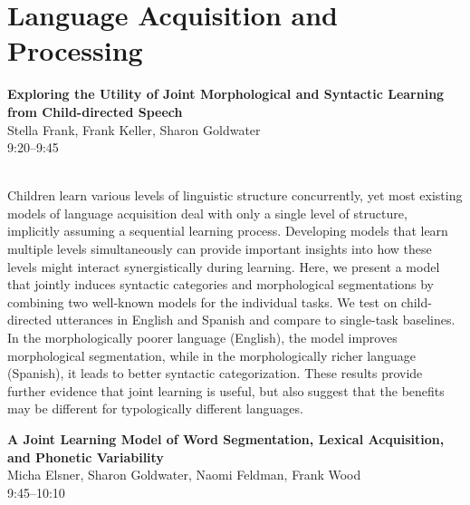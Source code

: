 \documentclass[twoside,makeidx]{book}
\begin{document}
\section{Language Acquisition and Processing}
\vspace{-1em}
\par\vspace{2em}\noindent%
\begin{minipage}{\linewidth}%
\begin{center}
\textbf{\normalsize Exploring the Utility of Joint Morphological and Syntactic Learning from Child-directed Speech}\\
\normalsize  Stella Frank,  Frank Keller,  Sharon Goldwater\\
{\small 9:20--9:45}\\
\end{center}
\end{minipage}\\[0.5em]
\nopagebreak%
\noindent%
{\small Children learn various levels of linguistic structure concurrently, yet most existing models of language acquisition deal with only a single level of structure, implicitly assuming a sequential learning process.  Developing models that learn multiple levels simultaneously can provide important insights into how these levels might interact synergistically during learning. Here, we present a model that jointly induces syntactic categories and morphological segmentations by combining two well-known models for the individual tasks.  We test on child-directed utterances in English and Spanish and compare to single-task baselines. In the morphologically poorer language (English), the model improves morphological segmentation, while in the morphologically richer language (Spanish), it leads to better  syntactic categorization. These results provide further evidence that joint learning is useful, but also suggest that the benefits may be different for typologically different languages.}
\par\vspace{2em}\noindent%
\begin{minipage}{\linewidth}%
\begin{center}
\textbf{\normalsize A Joint Learning Model of Word Segmentation, Lexical Acquisition, and Phonetic Variability}\\
\normalsize  Micha Elsner,  Sharon Goldwater,  Naomi Feldman,  Frank Wood\\
{\small 9:45--10:10}\\
\end{center}
\end{minipage}\\[0.5em]
\end{document}
